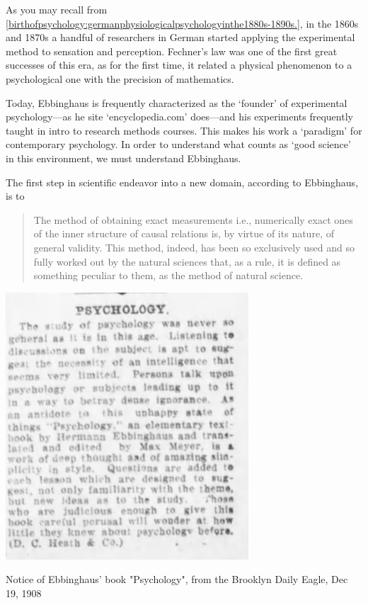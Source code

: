 \begin{refsection}
As you may recall from \ref{birthofpsychology:germanphysiologicalpsychologyinthe1880s-1890s.}, in the 1860s and 1870s a handful of researchers in German started applying the experimental method to sensation and perception. Fechner's law was one of the first great successes of this era, as for the first time, it related a physical phenomenon to a psychological one with the precision of mathematics. 

Today, Ebbinghaus is frequently characterized as the `founder' of experimental psychology---as he site `encyclopedia.com' does---and his experiments frequently taught in intro to research methods courses. This makes his work a `paradigm' for contemporary psychology. In order to understand what counts as `good science' in this environment, we must understand Ebbinghaus.

The first step in scientific endeavor into a new domain, according to Ebbinghaus, is to 

\begin{quote}

The method of obtaining exact measurements i.e., numerically exact ones of the inner structure of causal relations is, by virtue of its nature, of general validity. This method, indeed, has been so exclusively used and so fully worked out by the natural sciences that, as a rule, it is defined as something peculiar to them, as the method of natural science. ~\citep[p. 7]{Ebbinghaus:1885ud}
\end{quote}

\begin{marginfigure}
 \begin{center}

     \includegraphics{../images/ebbinghaus-clip.png}
\end{center}
 \caption{Notice of Ebbinghaus' book "Psychology", from the Brooklyn Daily Eagle, Dec 19, 1908}
\label{fig: ebbinghaus-clip}
\end{marginfigure}



\end{refsection}
